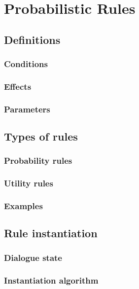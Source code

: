 \chapter{Probabilistic Rules}
\label{chap:rules}

\section{Definitions}

\subsection{Conditions}

\subsection{Effects}

\subsection{Parameters}

\section{Types of rules}

\subsection{Probability rules}

\subsection{Utility rules}

\subsection{Examples}

\section{Rule instantiation}

\subsection{Dialogue state}

\subsection{Instantiation algorithm}

